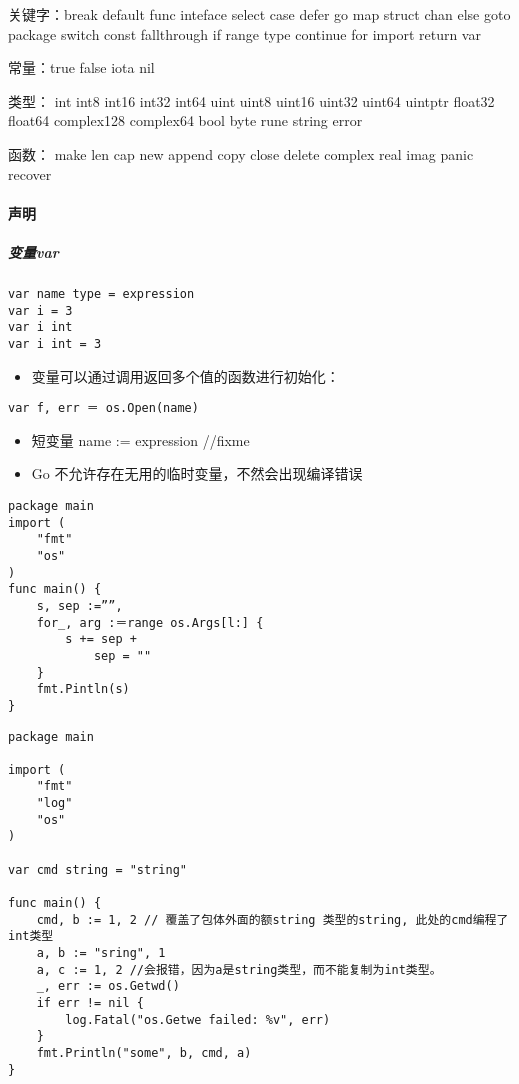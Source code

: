 关键字：break default func inteface select case defer go map struct chan
else goto package switch const fallthrough if range type continue for
import return var

常量：true false iota nil

类型： int int8 int16 int32 int64 uint uint8 uint16 uint32 uint64
uintptr float32 float64 complex128 complex64 bool byte rune string error

函数： make len cap new append copy close delete complex real imag panic
recover

\hypertarget{ux58f0ux660e}{%
\paragraph{声明}\label{ux58f0ux660e}}

\hypertarget{ux53d8ux91cfvar}{%
\subparagraph{变量var}\label{ux53d8ux91cfvar}}

\begin{verbatim}
var name type = expression
var i = 3
var i int
var i int = 3
\end{verbatim}

\begin{itemize}
\tightlist
\item
  变量可以通过调用返回多个值的函数进行初始化：
\end{itemize}

\begin{verbatim}
var f, err ＝ os.Open(name) 
\end{verbatim}

\begin{itemize}
\item
  短变量 name := expression //fixme
\item
  Go 不允许存在无用的临时变量，不然会出现编译错误
\end{itemize}

\begin{verbatim}
package main
import (
    "fmt"
    "os"
)
func main() {
    s, sep :=””,
    for_, arg :＝range os.Args[l:] {
        s += sep +
            sep = ""
    }
    fmt.Pintln(s)
}
\end{verbatim}

\begin{verbatim}
package main

import (
    "fmt"
    "log"
    "os"
)

var cmd string = "string"

func main() {
    cmd, b := 1, 2 // 覆盖了包体外面的额string 类型的string, 此处的cmd编程了int类型
    a, b := "sring", 1
    a, c := 1, 2 //会报错，因为a是string类型，而不能复制为int类型。
    _, err := os.Getwd()
    if err != nil {
        log.Fatal("os.Getwe failed: %v", err)
    }
    fmt.Println("some", b, cmd, a)
}
\end{verbatim}


